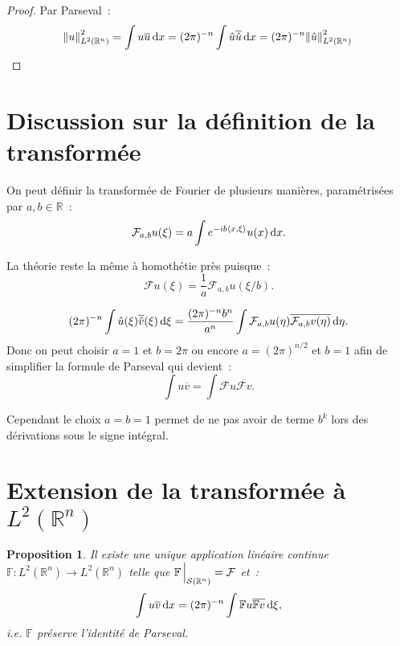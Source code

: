 \documentclass{report}
\newcommand{\R}{{\mathbb R}}
\newcommand{\scpr}[2]{\left\langle#1, #2\right\rangle}
\newcommand{\dx}{\dif x}
\newtheorem{prp}[thm]{Proposition}
\theoremstyle{definition}
\theoremstyle{remark}
\begin{document}
\begin{proof} Par Parseval~:
\[\norm u_{L^2(\R^n)}^2 = \int u\overline u\dif x = (2\pi)^{-n}\int \hat u\overline {\hat u}\dif x = (2\pi)^{-n}\norm {\hat u}_{L^2(\R^n)}^2\]
\end{proof}

\section{Discussion sur la définition de la transformée}

On peut définir la transformée de Fourier de plusieurs manières, paramétrisées par $a, b \in \R$~:
\[\mathcal F_{a,b}u(\xi) = a\int e^{-ib\scpr x\xi}u(x)\dx.\]

La théorie reste la même à homothétie près puisque~:
\[\mathcal Fu(\xi) = \frac 1a\mathcal F_{a,b}u(\xi/b).\]

\[(2\pi)^{-n}\int \hat u(\xi)\overline {\hat v}(\xi)\dif\xi = \frac {(2\pi)^{-n}b^n}{a^n}\int\mathcal F_{a,b}u(\eta)\overline {\mathcal F_{a,b}v(\eta)}\dif\eta.\]
Donc on peut choisir $a=1$ et $b=2\pi$ ou encore $a=(2\pi)^{n/2}$ et $b=1$ afin de simplifier la formule de Parseval qui devient~:
\[\int u\overline v = \int \mathcal Fu\overline {\mathcal Fv}.\]

Cependant le choix $a=b=1$ permet de ne pas avoir de terme $b^k$ lors des dérivations sous le signe intégral.

\section{Extension de la transformée à $L^2(\R^n)$}

\begin{prp} Il existe une unique application linéaire continue $\mathbb F : L^2(\R^n) \to L^2(\R^n)$ telle que $\mathbb F\sVert[2]_{\mathcal S(\R^n)} = \mathcal F$ et~:
\[\int u\overline v\dif x = (2\pi)^{-n}\int \mathbb Fu\overline {\mathbb Fv}\dif\xi,\]
i.e. $\mathbb F$ préserve l'identité de Parseval.
\end{prp}
\end{document}
